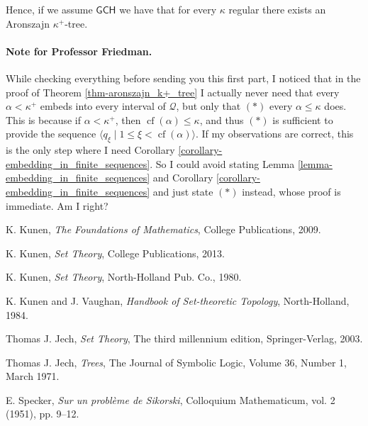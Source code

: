 \documentclass[12pt,a4paper]{report}
\theoremstyle{definition}
\theoremstyle{num.custom-title}
\DeclareMathOperator{\cf}{cf}
\newcommand{\GCH}{\ensuremath{\mathsf{GCH}}\xspace}
\begin{document}
Hence, if we assume \GCH we have that for every $\kappa$ regular there exists an Aronszajn $\kappa^+$-tree.


\paragraph{Note for Professor Friedman.} While checking everything before sending you this first part, I noticed that in the proof of Theorem \ref{thm-aronszajn_k+_tree} I actually never need that every $\alpha < \kappa^+$ embeds into every interval of $\mathcal{Q}$, but only that $(*)$ every $\alpha \leq \kappa$ does. This is because if $\alpha < \kappa^+$, then $\cf(\alpha) \leq \kappa$, and thus $(*)$ is sufficient to provide the sequence $\langle q_\xi \mid 1 \leq \xi < \cf(\alpha) \rangle$. If my observations are correct, this is the only step where I need Corollary \ref{corollary-embedding_in_finite_sequences}. So I could avoid stating Lemma \ref{lemma-embedding_in_finite_sequences} and Corollary \ref{corollary-embedding_in_finite_sequences} and just state $(*)$ instead, whose proof is immediate. Am I right?




























\begin{thebibliography}{9}

K. Kunen, \emph{The Foundations of Mathematics}, College Publications, 2009.

K. Kunen, \emph{Set Theory}, College Publications, 2013.

K. Kunen, \emph{Set Theory}, North-Holland Pub. Co., 1980.

K. Kunen and J. Vaughan, \emph{Handbook of Set-theoretic Topology}, North-Holland, 1984.

Thomas J. Jech, \emph{Set Theory}, The third millennium edition, Springer-Verlag, 2003.

Thomas J. Jech, \emph{Trees}, The Journal of Symbolic Logic, Volume 36, Number 1, March 1971.

E. Specker, \emph{Sur un problème de Sikorski}, Colloquium Mathematicum, vol. 2 (1951), pp. 9--12.

\end{thebibliography}
\end{document}
